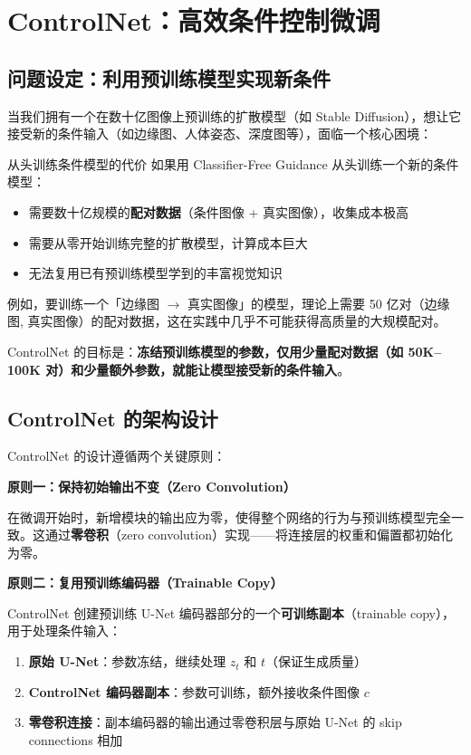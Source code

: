 \section{ControlNet：高效条件控制微调}

\subsection{问题设定：利用预训练模型实现新条件}

当我们拥有一个在数十亿图像上预训练的扩散模型（如 Stable Diffusion），想让它接受新的条件输入（如边缘图、人体姿态、深度图等），面临一个核心困境：

\begin{warningbox}{从头训练条件模型的代价}
如果用 Classifier-Free Guidance 从头训练一个新的条件模型：
\begin{itemize}
    \item 需要数十亿规模的\textbf{配对数据}（条件图像 + 真实图像），收集成本极高
    \item 需要从零开始训练完整的扩散模型，计算成本巨大
    \item 无法复用已有预训练模型学到的丰富视觉知识
\end{itemize}
例如，要训练一个「边缘图 $\to$ 真实图像」的模型，理论上需要 50 亿对（边缘图, 真实图像）的配对数据，这在实践中几乎不可能获得高质量的大规模配对。
\end{warningbox}

ControlNet 的目标是：\textbf{冻结预训练模型的参数，仅用少量配对数据（如 50K--100K 对）和少量额外参数，就能让模型接受新的条件输入}。

\subsection{ControlNet 的架构设计}

ControlNet 的设计遵循两个关键原则：

\textbf{原则一：保持初始输出不变（Zero Convolution）}

在微调开始时，新增模块的输出应为零，使得整个网络的行为与预训练模型完全一致。这通过\textbf{零卷积}（zero convolution）实现——将连接层的权重和偏置都初始化为零。

\textbf{原则二：复用预训练编码器（Trainable Copy）}

ControlNet 创建预训练 U-Net 编码器部分的一个\textbf{可训练副本}（trainable copy），用于处理条件输入：

\begin{enumerate}
    \item \textbf{原始 U-Net}：参数冻结，继续处理 $z_t$ 和 $t$（保证生成质量）
    \item \textbf{ControlNet 编码器副本}：参数可训练，额外接收条件图像 $c$
    \item \textbf{零卷积连接}：副本编码器的输出通过零卷积层与原始 U-Net 的 skip connections 相加
\end{enumerate}

